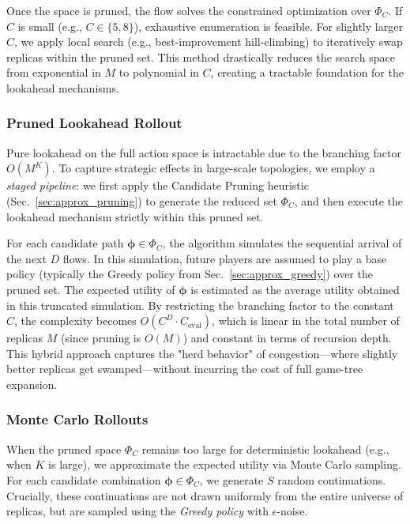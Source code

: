\documentclass[journal]{IEEEtran}
\theoremstyle{plain}
\theoremstyle{definition}
\theoremstyle{remark}
\begin{document}
Once the space is pruned, the flow solves the constrained optimization over $\Phi_C$. If $C$ is small (e.g., $C \in \{5,8\}$), exhaustive enumeration is feasible. For slightly larger $C$, we apply local search (e.g., best-improvement hill-climbing) to iteratively swap replicas within the pruned set. This method drastically reduces the search space from exponential in $M$ to polynomial in $C$, creating a tractable foundation for the lookahead mechanisms.

\subsubsection{Pruned Lookahead Rollout}
\label{sec:approx_lookahead}

Pure lookahead on the full action space is intractable due to the branching factor $O(M^K)$. To capture strategic effects in large-scale topologies, we employ a \textit{staged pipeline}: we first apply the Candidate Pruning heuristic (Sec.~\ref{sec:approx_pruning}) to generate the reduced set $\Phi_C$, and then execute the lookahead mechanism strictly within this pruned set.

For each candidate path $\boldsymbol{\phi} \in \Phi_C$, the algorithm simulates the sequential arrival of the next $D$ flows. In this simulation, future players are assumed to play a base policy (typically the Greedy policy from Sec.~\ref{sec:approx_greedy}) over the pruned set. The expected utility of $\boldsymbol{\phi}$ is estimated as the average utility obtained in this truncated simulation. By restricting the branching factor to the constant $C$, the complexity becomes $O(C^D \cdot C_{\text{eval}})$, which is linear in the total number of replicas $M$ (since pruning is $O(M)$) and constant in terms of recursion depth. This hybrid approach captures the "herd behavior" of congestion—where slightly better replicas get swamped—without incurring the cost of full game-tree expansion.

\subsubsection{Monte Carlo Rollouts}
\label{sec:approx_montecarlo}

When the pruned space $\Phi_C$ remains too large for deterministic lookahead (e.g., when $K$ is large), we approximate the expected utility via Monte Carlo sampling. For each candidate combination $\boldsymbol{\phi} \in \Phi_C$, we generate $S$ random continuations. Crucially, these continuations are not drawn uniformly from the entire universe of replicas, but are sampled using the \textit{Greedy policy} with $\epsilon$-noise. 
\end{document}
